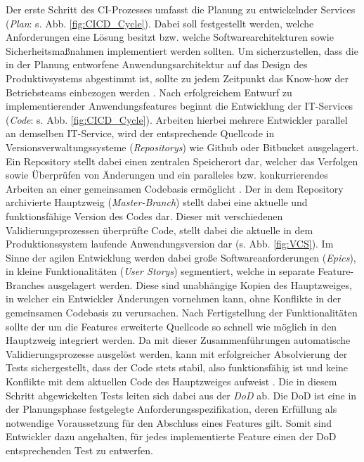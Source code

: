 Der erste Schritt des CI-Prozesses umfasst die Planung zu entwickelnder Services (\textit{Plan}: s. Abb. \ref*{fig:CICD_Cycle}). Dabei soll festgestellt werden, welche Anforderungen eine Lösung besitzt bzw. welche Softwarearchitekturen sowie Sicherheitsmaßnahmen implementiert werden sollten. Um sicherzustellen, dass die in der Planung entworfene Anwendungsarchitektur auf das Design des Produktivsystems abgestimmt ist, sollte zu jedem Zeitpunkt das Know-how der Betriebsteams einbezogen werden \cite[16]{Halstenberg.2020}. Nach erfolgreichem Entwurf zu implementierender Anwendungsfeatures beginnt die Entwicklung der IT-Services (\textit{Code}: s. Abb. \ref*{fig:CICD_Cycle}). Arbeiten hierbei mehrere Entwickler parallel an demselben IT-Service, wird der entsprechende Quellcode in Versionsverwaltungssysteme (\textit{Repositorys}) wie Github oder Bitbucket ausgelagert. Ein Repository stellt dabei einen zentralen Speicherort dar, welcher das Verfolgen sowie Überprüfen von Änderungen und ein paralleles bzw. konkurrierendes Arbeiten an einer gemeinsamen Codebasis ermöglicht \cite[31]{Loeliger.2012}. Der in dem Repository archivierte Hauptzweig (\textit{Master-Branch}) stellt dabei eine aktuelle und funktionsfähige Version des Codes dar. Dieser mit verschiedenen Validierungsprozessen überprüfte Code, stellt dabei die aktuelle in dem Produktionssystem laufende Anwendungsversion dar (s. Abb. \ref*{fig:VCS}). Im Sinne der agilen Entwicklung werden dabei große Softwareanforderungen (\textit{Epics}), in kleine Funktionalitäten (\textit{User Storys}) segmentiert, welche in separate Feature-Branches ausgelagert werden. Diese sind unabhängige Kopien des Hauptzweiges, in welcher ein Entwickler Änderungen vornehmen kann, ohne Konflikte in der gemeinsamen Codebasis zu verursachen. Nach Fertigstellung der Funktionalitäten sollte der um die Features erweiterte Quellcode so schnell wie möglich in den Hauptzweig integriert werden. Da mit dieser Zusammenführungen automatische Validierungsprozesse ausgelöst werden, kann mit erfolgreicher Absolvierung der Tests sichergestellt, dass der Code stets stabil, also funktionsfähig ist und keine Konflikte mit dem aktuellen Code des Hauptzweiges aufweist \cite[169]{Loeliger.2012}. Die in diesem Schritt abgewickelten Tests leiten sich dabei aus der \textit{\ac{DoD}} ab. Die DoD ist eine in der Planungsphase festgelegte Anforderungsspezifikation, deren Erfüllung als notwendige Voraussetzung für den Abschluss eines Features gilt. Somit sind Entwickler dazu angehalten, für jedes implementierte Feature einen der DoD entsprechenden Test zu entwerfen.
